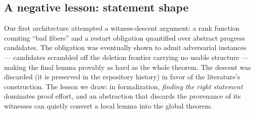 \documentclass{article}
\begin{document}
\subsection{A negative lesson: statement shape}\label{sec:descent}
Our first architecture attempted a witness-descent argument: a rank function
counting ``bad fibers'' and a restart obligation quantified over abstract
progress candidates. The obligation was eventually shown to admit
adversarial instances --- candidates scrambled off the deletion frontier
carrying no usable structure --- making the final lemma provably as hard as
the whole theorem. The descent was discarded (it is preserved in the
repository history) in favor of the literature's construction. The lesson we
draw: in formalization, \emph{finding the right statement} dominates proof
effort, and an abstraction that discards the provenance of its witnesses can
quietly convert a local lemma into the global theorem.
\end{document}
